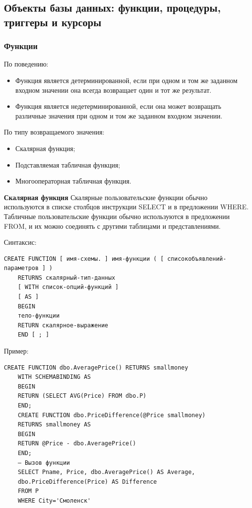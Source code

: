 \newpage
\subsection{Объекты базы данных: функции, процедуры, триггеры и курсоры}

\subsubsection{Функции}

По поведению:
\begin{itemize}
	\item Функция является детерминированной, если при одном и том же
	заданном входном значении она всегда возвращает один и тот же
	результат.
	\item Функция является недетерминированной, если она может возвращать
	различные значения при одном и том же заданном входном значении.
\end{itemize}

По типу возвращаемого значения:
\begin{itemize}
	\item Скалярная функция;
	\item Подставляемая табличная функция;
	\item Многооператорная табличная функция.
\end{itemize}

\textbf{Скалярная функция}
Скалярные пользовательские функции обычно используются в списке столбцов инструкции
SELECT и в предложении WHERE. Табличные пользовательские функции обычно
используются в предложении FROM, и их можно соединять с другими таблицами и
представлениями.

Синтаксис:
\begin{lstlisting}[label=scalarfuncsint]
	CREATE FUNCTION [ имя-схемы. ] имя-функции ( [ списокобъявлений-параметров ] )
	RETURNS скалярный-тип-данных
	[ WITH список-опций-функций ]
	[ AS ]
	BEGIN
	тело-функции
	RETURN скалярное-выражение
	END [ ; ]
\end{lstlisting}
Пример:
\begin{lstlisting}[label=scalarfuncexample]
	CREATE FUNCTION dbo.AveragePrice() RETURNS smallmoney
	WITH SCHEMABINDING AS
	BEGIN
	RETURN (SELECT AVG(Price) FROM dbo.P)
	END;
	CREATE FUNCTION dbo.PriceDifference(@Price smallmoney)
	RETURNS smallmoney AS
	BEGIN
	RETURN @Price - dbo.AveragePrice()
	END;
	— Вызов функции
	SELECT Pname, Price, dbo.AveragePrice() AS Average,
	dbo.PriceDifference(Price) AS Difference
	FROM P
	WHERE City='Смоленск'
\end{lstlisting}

